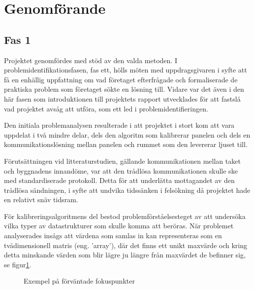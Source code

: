 \section{Genomförande} %
\label{sec:genomf_rande}
    \subsection{Fas 1} %
    \label{sub:steg_1}
        Projektet genomfördes med stöd av den valda metoden. I problemidentifikationsfasen, fas ett, hölls möten med uppdragsgivaren i syfte att få en enhällig uppfattning om vad företaget efterfrågade och formaliserade de praktiska problem som företaget sökte en lösning till. Vidare var det även i den här fasen som introduktionen till projektets rapport utvecklades för att fastslå vad projektet avsåg att utföra, som ett led i problemidentifieringen. \bigskip

        Den initiala problemanalysen resulterade i att projektet i stort kom att vara uppdelat i två mindre delar, dels den algoritm som kalibrerar panelen och dels en kommunikationslösning mellan panelen och rummet som den levererar ljuset till. \bigskip

        Förutsättningen vid litteraturstudien, gällande kommunikationen mellan taket och byggnadens innandöme, var att den trådlösa kommunikationen skulle ske med standardiserade protokoll. Detta för att underlätta mottagandet av den trådlösa sändningen, i syfte att undvika tidssänken i felsökning då projektet hade en relativt snäv tidsram.\bigskip

        För kalibreringsalgoritmens del bestod problemförståelsesteget av att undersöka vilka typer av datastrukturer som skulle komma att beröras. När problemet analyserades insågs att värdena som samlas in kan representeras som en tvådimensionell matris (eng. 'array'), där det finns ett unikt maxvärde och kring detta minskande värden som blir lägre ju längre från maxvärdet de befinner sig, se figur\ref{fig:array}. \bigskip

        \begin{figure}[hbt]
        \centering
            \begin{subfigure}{0.2\textwidth}
            \end{subfigure}
            \begin{subfigure}{0.2\textwidth}
            \end{subfigure}
        \caption{\label{fig:array} Exempel på förväntade fokuspunkter}
        \end{figure}



